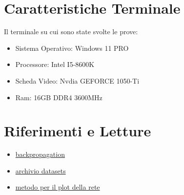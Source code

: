 \documentclass{article}
\begin{document}
    \section{Caratteristiche Terminale}\label{sec:caratteristiche-terminale}
        Il terminale su cui sono state svolte le prove:
        \begin{itemize}
            \item Sistema Operativo: Windows 11 PRO
            \item Processore: Intel I5-8600K
            \item Scheda Video: Nvdia GEFORCE 1050-Ti
            \item Ram: 16GB DDR4 3600MHz
        \end{itemize}
    \section{Riferimenti e Letture}\label{sec:riferimenti-e-letture}
        \begin{itemize}
            \item \href{https://rstudio-pubs-static.s3.amazonaws.com/337306_79a7966fad184532ab3ad66b322fe96e.html#backpropagation}{backpropagation}
            \item \href{https://archive-beta.ics.uci.edu/} {archivio datasets}
            \item \href{https://gist.github.com/craffel/2d727968c3aaebd10359} {metodo per il plot della rete}
        \end{itemize}
\end{document}

